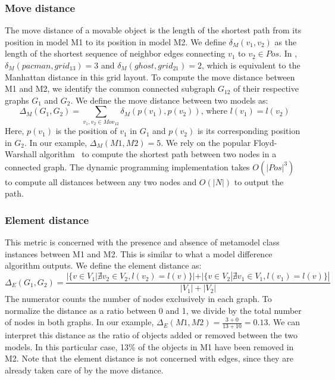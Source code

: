 \subsubsection{Move distance}
The move distance of a movable object is the length of the shortest path from its position in model M1 to its position in model M2.
We define $\delta_M(v_1,v_2)$ as the length of the shortest sequence of neighbor edges connecting $v_1$ to $v_2 \in Pos$.
In , $\delta_M(pacman,grid_{13})=3$ and $\delta_M(ghost,grid_{21})=2$, which is equivalent to the Manhattan distance in this grid layout.
To compute the move distance between M1 and M2, we identify the common connected subgraph $G_{12}$ of their respective graphs $G_1$ and $G_2$.
We define the move distance between two models as:
\[
\Delta_M(G_1,G_2)=\sum_{v_1,v_2 \in Mov_{12}}{\delta_M(p(v_1),p(v_2))} \mbox{, where } l(v_1)=l(v_2)
\]
Here, $p(v_1)$ is the position of $v_1$ in $G_1$ and $p(v_2)$ is its corresponding position in $G_2$.
In our example, $\Delta_M(M1,M2)=5$.
We rely on the popular Floyd-Warshall algorithm~\cite{Floyd1962,Warshall1962} to compute the shortest path between two nodes in a connected graph.
The dynamic programming implementation takes $O(|Pos|^3)$ to compute all distances between any two nodes and $O(|N|)$ to output the path.


\subsubsection{Element distance}
This metric is concerned with the presence and absence of metamodel class instances between M1 and M2.
This is similar to what a model difference algorithm outputs.
We define the element distance as:
\[
\Delta_E(G_1,G_2)=\frac{|\{v \in V_1 | \nexists v_2 \in V_2, l(v_2)=l(v)\}|+|\{v \in V_2 | \nexists v_1 \in V_1, l(v_1)=l(v)\}|}{|V_1|+|V_2|}
\]
The numerator counts the number of nodes exclusively in each graph.
To normalize the distance as a ratio between 0 and 1, we divide by the total number of nodes in both graphs.
In our example, $\Delta_E(M1,M2)=\frac{3+0}{13+10}=0.13$.
We can interpret this distance as the ratio of objects added or removed between the two models.
In this particular case, 13\% of the objects in M1 have been removed in M2.
Note that the element distance is not concerned with edges, since they are already taken care of by the move distance.


